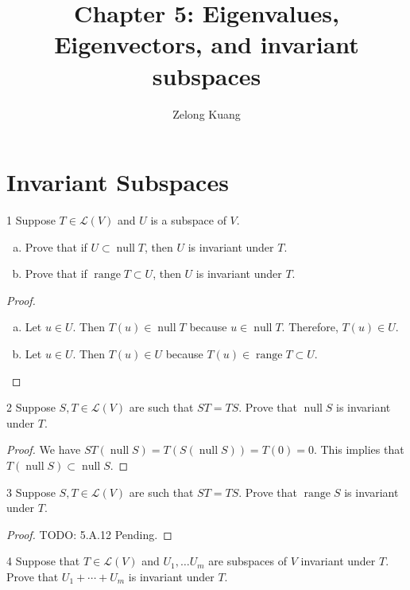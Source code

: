 \documentclass{article}
\title{\vspace{-2em}Chapter 5: Eigenvalues, Eigenvectors, and invariant subspaces}
\author{Zelong Kuang}
\newenvironment{problem}[1]{\begin{prob*}{#1}{}}{\end{prob*}}
\DeclareMathOperator{\Null}{null}
\DeclareMathOperator{\Range}{range}
\begin{document}
\maketitle

\newpage
\tableofcontents
\newpage

\section{Invariant Subspaces}

\begin{problem}{1}
Suppose $T \in \mathcal{L}(V)$ and $U$ is a subspace of $V$.
\begin{enumerate}[(a)]
  \item Prove that if $U \subset \Null T$, then $U$ is invariant under $T$.
  \item Prove that if $\Range T \subset U$, then $U$ is invariant under $T$.
\end{enumerate}
\end{problem}
\begin{proof}
  \begin{enumerate}[(a)]
    \item Let $u \in U$. Then $T(u) \in \Null T$ because $u \in \Null T$. Therefore, $T(u) \in U$.
    \item Let $u \in U$. Then $T(u) \in U$ because $T(u) \in \Range T \subset U$.
  \end{enumerate}
\end{proof}

\begin{problem}{2}
Suppose $S,T \in \mathcal{L}(V)$ are such that $ST = TS$. Prove that $\Null S$ is invariant under $T$.
\end{problem}

\begin{proof}
We have $ST(\Null S) = T(S(\Null S)) = T(0) = 0$. This implies that $T(\Null S) \subset \Null S$.
\end{proof}

\begin{problem}{3}
Suppose $S,T \in \mathcal{L}(V)$ are such that $ST = TS$. Prove that $\Range S$ is invariant under $T$.
\end{problem}

\begin{proof}
TODO: 5.A.12 Pending.
\end{proof}

\begin{problem}{4}
Suppose that $T \in \mathcal{L}(V)$ and $U_1, \ldots U_m$ are subspaces of $V$ invariant under $T$. Prove that $U_1 + \cdots + U_m$ is invariant under $T$.
\end{problem}
\end{document}
